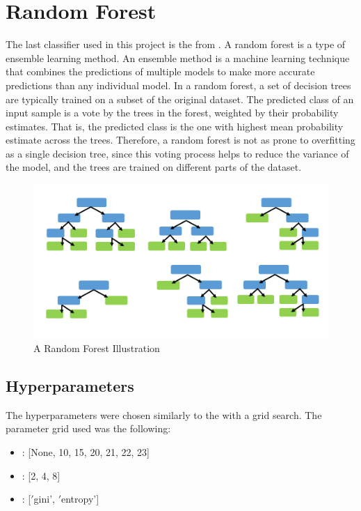 \section{Random Forest}
The last classifier used in this project is the  from .
A random forest is a type of ensemble learning method.
An ensemble method is a machine learning technique that combines the predictions of multiple models to make more accurate predictions than any individual model.
In a random forest, a set of decision trees are typically trained on a subset of the original dataset.
The predicted class of an input sample is a vote by the trees in the forest, weighted by their probability estimates.
That is, the predicted class is the one with highest mean probability estimate across the trees.
Therefore, a random forest is not as prone to overfitting as a single decision tree, since this voting process helps to reduce the variance of the model, and the trees are trained on different parts of the dataset.

\begin{figure}[H]
    \centering
    \includegraphics[scale=0.3]{figures_for_report/random_forest_simple_example}
    \captionsetup{justification=centering,margin=2cm}
    \caption{A Random Forest Illustration}\label{fig:figure}
\end{figure}


\subsection{Hyperparameters}\label{subsec:hyperparameters}
The hyperparameters were chosen similarly to the  with a grid search.
The parameter grid used was the following:\\

\begin{center}
    \begin{minipage}{4in}
\begin{itemize}
    \item {}: [None, 10, 15, 20, 21, 22, 23]
    \item {}: [2, 4, 8]
    \item {}: [\('\)gini', \('\)entropy'] \\
\end{itemize}
            \end{minipage}
\end{center}

